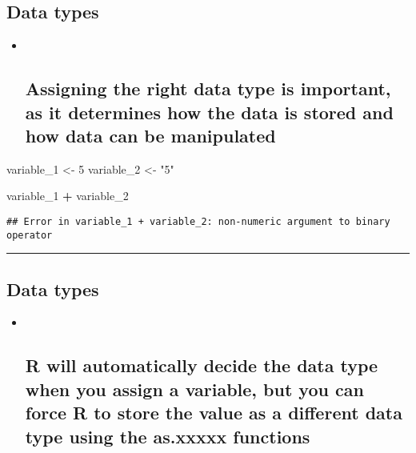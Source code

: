 \documentclass[]{article}
\newenvironment{Shaded}{\begin{snugshade}}{\end{snugshade}}
\newcommand{\DecValTok}[1]{\textcolor[rgb]{0.00,0.00,0.81}{#1}}
\newcommand{\NormalTok}[1]{#1}
\newcommand{\OperatorTok}[1]{\textcolor[rgb]{0.81,0.36,0.00}{\textbf{#1}}}
\newcommand{\StringTok}[1]{\textcolor[rgb]{0.31,0.60,0.02}{#1}}
\begin{document}
\hypertarget{data-types-1}{%
\subsection{Data types}\label{data-types-1}}

\begin{itemize}
\item ~
  \hypertarget{assigning-the-right-data-type-is-important-as-it-determines-how-the-data-is-stored-and-how-data-can-be-manipulated}{%
  \subsection{Assigning the right data type is important, as it
  determines how the data is stored and how data can be
  manipulated}\label{assigning-the-right-data-type-is-important-as-it-determines-how-the-data-is-stored-and-how-data-can-be-manipulated}}
\end{itemize}

\begin{Shaded}
\begin{Highlighting}[]
\NormalTok{variable_}\DecValTok{1}\NormalTok{ <-}\StringTok{ }\DecValTok{5}
\NormalTok{variable_}\DecValTok{2}\NormalTok{ <-}\StringTok{ "5"}

\NormalTok{variable_}\DecValTok{1} \OperatorTok{+}\StringTok{ }\NormalTok{variable_}\DecValTok{2}
\end{Highlighting}
\end{Shaded}

\begin{verbatim}
## Error in variable_1 + variable_2: non-numeric argument to binary operator
\end{verbatim}

\begin{center}\rule{0.5\linewidth}{\linethickness}\end{center}

\hypertarget{data-types-2}{%
\subsection{Data types}\label{data-types-2}}

\begin{itemize}
\item ~
  \hypertarget{r-will-automatically-decide-the-data-type-when-you-assign-a-variable-but-you-can-force-r-to-store-the-value-as-a-different-data-type-using-the-as.xxxxx-functions}{%
  \subsection{R will automatically decide the data type when you assign
  a variable, but you can force R to store the value as a different data
  type using the as.xxxxx
  functions}\label{r-will-automatically-decide-the-data-type-when-you-assign-a-variable-but-you-can-force-r-to-store-the-value-as-a-different-data-type-using-the-as.xxxxx-functions}}
\end{itemize}
\end{document}
